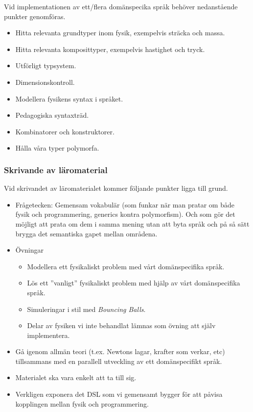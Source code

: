 \documentclass[12pt,a4paper]{article}
\begin{document}
Vid implementationen av ett/flera domänspecika språk behöver nedanstående punkter genomföras.

\begin{itemize}
    \item Hitta relevanta grundtyper inom fysik, exempelvis sträcka och massa.
    \item Hitta relevanta komposittyper, exempelvis hastighet och tryck.
    \item Utförligt typsystem.
    \item Dimensionskontroll.
    \item Modellera fysikens syntax i språket.
    \item Pedagogiska syntaxträd.
    \item Kombinatorer och konstruktorer.
    \item Hålla våra typer polymorfa.
\end{itemize}

\subsubsection*{Skrivande av läromaterial}

Vid skrivandet av läromaterialet kommer följande punkter ligga till grund.

\begin{itemize}
    \item Frågetecken: Gemensam vokabulär (som funkar när man pratar om både fysik och programmering, generics kontra polymorfism). Och som gör det möjligt att prata om dem i samma mening utan att byta språk och på så sätt brygga det semantiska gapet mellan områdena.
    \item Övningar
        \begin{itemize}
            \item Modellera ett fysikaliskt problem med vårt domänspecifika språk.
            \item Lös ett ''vanligt'' fysikaliskt problem med hjälp av vårt domänspecifika språk.
            \item Simuleringar i stil med \textit{Bouncing Balls}.
            \item Delar av fysiken vi inte behandlat lämnas som övning att själv implementera.
        \end{itemize}
    \item Gå igenom allmän teori (t.ex. Newtons lagar, krafter som verkar, etc) tillsammans med en parallell utveckling av ett domänspecifikt språk.
    \item Materialet ska vara enkelt att ta till sig.
    \item Verkligen exponera det DSL som vi gemensamt bygger för att påvisa kopplingen mellan fysik och programmering.
\end{itemize}
\end{document}

